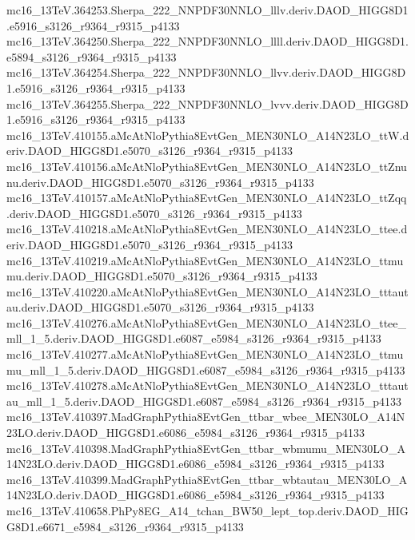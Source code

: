 mc16_13TeV.364253.Sherpa_222_NNPDF30NNLO_lllv.deriv.DAOD_HIGG8D1.e5916_s3126_r9364_r9315_p4133 \\
mc16_13TeV.364250.Sherpa_222_NNPDF30NNLO_llll.deriv.DAOD_HIGG8D1.e5894_s3126_r9364_r9315_p4133 \\
mc16_13TeV.364254.Sherpa_222_NNPDF30NNLO_llvv.deriv.DAOD_HIGG8D1.e5916_s3126_r9364_r9315_p4133 \\
mc16_13TeV.364255.Sherpa_222_NNPDF30NNLO_lvvv.deriv.DAOD_HIGG8D1.e5916_s3126_r9364_r9315_p4133 \\
mc16_13TeV.410155.aMcAtNloPythia8EvtGen_MEN30NLO_A14N23LO_ttW.deriv.DAOD_HIGG8D1.e5070_s3126_r9364_r9315_p4133 \\
mc16_13TeV.410156.aMcAtNloPythia8EvtGen_MEN30NLO_A14N23LO_ttZnunu.deriv.DAOD_HIGG8D1.e5070_s3126_r9364_r9315_p4133 \\
mc16_13TeV.410157.aMcAtNloPythia8EvtGen_MEN30NLO_A14N23LO_ttZqq.deriv.DAOD_HIGG8D1.e5070_s3126_r9364_r9315_p4133 \\
mc16_13TeV.410218.aMcAtNloPythia8EvtGen_MEN30NLO_A14N23LO_ttee.deriv.DAOD_HIGG8D1.e5070_s3126_r9364_r9315_p4133 \\
mc16_13TeV.410219.aMcAtNloPythia8EvtGen_MEN30NLO_A14N23LO_ttmumu.deriv.DAOD_HIGG8D1.e5070_s3126_r9364_r9315_p4133 \\
mc16_13TeV.410220.aMcAtNloPythia8EvtGen_MEN30NLO_A14N23LO_tttautau.deriv.DAOD_HIGG8D1.e5070_s3126_r9364_r9315_p4133 \\
mc16_13TeV.410276.aMcAtNloPythia8EvtGen_MEN30NLO_A14N23LO_ttee_mll_1_5.deriv.DAOD_HIGG8D1.e6087_e5984_s3126_r9364_r9315_p4133 \\
mc16_13TeV.410277.aMcAtNloPythia8EvtGen_MEN30NLO_A14N23LO_ttmumu_mll_1_5.deriv.DAOD_HIGG8D1.e6087_e5984_s3126_r9364_r9315_p4133 \\
mc16_13TeV.410278.aMcAtNloPythia8EvtGen_MEN30NLO_A14N23LO_tttautau_mll_1_5.deriv.DAOD_HIGG8D1.e6087_e5984_s3126_r9364_r9315_p4133 \\
mc16_13TeV.410397.MadGraphPythia8EvtGen_ttbar_wbee_MEN30LO_A14N23LO.deriv.DAOD_HIGG8D1.e6086_e5984_s3126_r9364_r9315_p4133 \\
mc16_13TeV.410398.MadGraphPythia8EvtGen_ttbar_wbmumu_MEN30LO_A14N23LO.deriv.DAOD_HIGG8D1.e6086_e5984_s3126_r9364_r9315_p4133 \\
mc16_13TeV.410399.MadGraphPythia8EvtGen_ttbar_wbtautau_MEN30LO_A14N23LO.deriv.DAOD_HIGG8D1.e6086_e5984_s3126_r9364_r9315_p4133 \\
mc16_13TeV.410658.PhPy8EG_A14_tchan_BW50_lept_top.deriv.DAOD_HIGG8D1.e6671_e5984_s3126_r9364_r9315_p4133 \\
